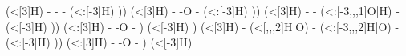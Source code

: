 \begin{struct}
{                                                                (<[3]H)
                                                              -
                                                              -
                                                              -
                                                                (<:[-3]H)
                                                            ))
                                                              (<[3]H)
                                                            -
                                                            -\textcolor{O}{O}
                                                            -
                                                              (<:[-3]H)
                                                          ))
                                                            (<[3]H)
                                                          -
                                                          -
                                                            (<:[-3,,,1]\textcolor{O}{O}|\textcolor{O}{H})
                                                          -
                                                            (<[-3]H)
                                                        ))
                                                          (<:[3]H)
                                                        -
                                                        -\textcolor{O}{O}
                                                        -
                                                      )
                                                        (<[-3]H)
                                                    )
                                                      (<[3]H)
                                                    -
                                                      (<[,,,2]\textcolor{O}{H}|\textcolor{O}{O})
                                                    -
                                                      (<:[-3,,,2]\textcolor{O}{H}|\textcolor{O}{O})
                                                    -
                                                      (<:[-3]H)
                                                  ))
                                                    (<:[3]H)
                                                  -
                                                  -\textcolor{O}{O}
                                                  -
                                                )
                                                  (<[-3]H)
}
\end{struct}
